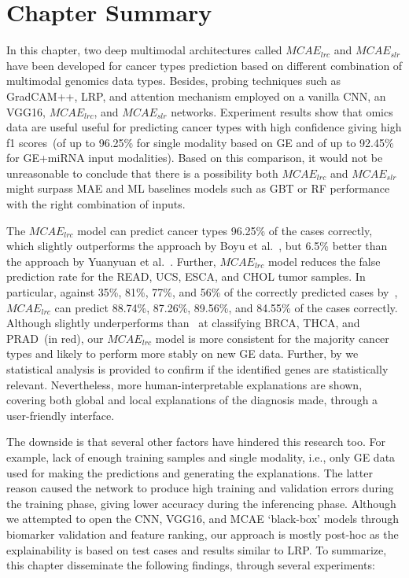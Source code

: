 \section{Chapter Summary}\label{chapter_5:conclusion}
In this chapter, two deep multimodal architectures called $MCAE_{lrc}$ and $MCAE_{slr}$ have been developed for cancer types prediction based on different combination of multimodal genomics data types. Besides, probing techniques such as GradCAM++, LRP, and attention mechanism employed on a vanilla CNN, an VGG16, $MCAE_{lrc}$, and $MCAE_{slr}$ networks. Experiment results show that omics data are useful useful for predicting cancer types with high confidence giving high f1 scores~(of up to 96.25\% for single modality based on GE and of up to 92.45\% for GE+miRNA input modalities). Based on this comparison, it would not be unreasonable to conclude that there is a possibility both $MCAE_{lrc}$ and $MCAE_{slr}$ might surpass MAE and ML baselines models such as GBT or RF performance with the right combination of inputs. 

\hspace*{3.5mm} The $MCAE_{lrc}$ model can predict cancer types 96.25\% of the cases correctly, which slightly outperforms the approach by Boyu et al.~\cite{lyu2018deep}, but 6.5\% better than the approach by Yuanyuan et al.~\cite{li2017comprehensive}. Further, $MCAE_{lrc}$ model reduces the false prediction rate for the READ, UCS, ESCA, and CHOL tumor samples. In particular, against 35\%, 81\%, 77\%, and 56\% of the correctly predicted cases by~\cite{lyu2018deep}, $MCAE_{lrc}$ can predict 88.74\%, 87.26\%, 89.56\%, and 84.55\% of the cases correctly. Although slightly underperforms than~\cite{lyu2018deep} at classifying BRCA, THCA, and PRAD~(in red), our $MCAE_{lrc}$ model is more consistent for the majority cancer types and likely to perform more stably on new GE data. Further, by we statistical analysis is provided to confirm if the identified genes are statistically relevant. Nevertheless, more human-interpretable explanations are shown, covering both global and local explanations of the diagnosis made, through a user-friendly interface. 

\hspace*{3.5mm} The downside is that several other factors have hindered this research too. For example, lack of enough training samples and single modality, i.e., only GE data used for making the predictions and generating the explanations. The latter reason caused the network to produce high training and validation errors during the training phase, giving lower accuracy during the inferencing phase. Although we attempted to open the CNN, VGG16, and MCAE `black-box' models through biomarker validation and feature ranking, our approach is mostly post-hoc as the explainability is based on test cases and results similar to LRP. 
To summarize, this chapter disseminate the following findings, through several experiments:  

